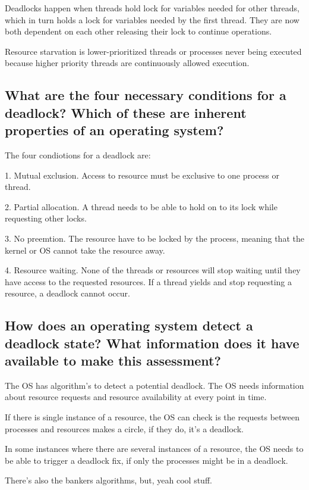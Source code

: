 \documentclass[a4paper]{article}
\begin{document}
Deadlocks happen when threads hold lock for variables needed for other threads, which in turn holds a lock for variables needed by the first thread. They are now both dependent on each other releasing their lock to continue operations. 

Resource starvation is lower-prioritized threads or processes never being executed because higher priority threads are continuously allowed execution. 

\subsection{What are the four necessary conditions for a deadlock? Which of these are inherent properties of an
operating system?}

The four condiotions for a deadlock are:

1. Mutual exclusion.
Access to resource must be exclusive to one process or thread.
    
2. Partial allocation.
A thread needs to be able to hold on to its lock while requesting other locks.

3. No preemtion.
The resource have to be locked by the process, meaning that the kernel or OS cannot take the resource away.
 
4. Resource waiting.
None of the threads or resources will stop waiting until they have access to the requested resources. If a thread yields and stop requesting a resource, a deadlock cannot occur.



\subsection{How does an operating system detect a deadlock state? What information does it have available to
make this assessment?}
The OS has algorithm's to detect a potential deadlock. The OS needs information about resource requests and resource availability at every point in time. 

If there is single instance of a resource, the OS can check is the requests between processes and resources makes a circle, if they do, it's a deadlock. 

In some instances where there are several instances of a resource, the OS needs to be able to trigger a deadlock fix, if only the processes might be in a deadlock.

There's also the bankers algorithms, but, yeah cool stuff.
\end{document}
